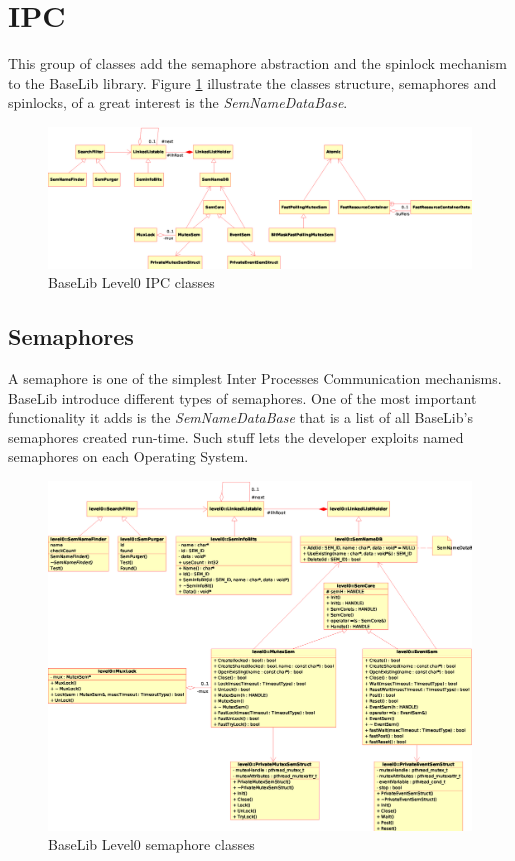 \section{IPC}
This group of classes add the semaphore abstraction and the spinlock mechanism to the BaseLib library. Figure \ref{f:level0:ipc} illustrate the classes structure, semaphores and spinlocks, of a great interest is the \textit{SemNameDataBase}.

\begin{figure}[h!]
 \begin{center}
  \includegraphics[width=\textwidth]{level0/level0-IPC.eps}
  \caption{BaseLib Level0 IPC classes}
  \label{f:level0:ipc}
 \end{center}
\end{figure}



\subsection{Semaphores}
A semaphore is one of the simplest Inter Processes Communication mechanisms. BaseLib introduce different types of semaphores. One of the most important functionality it adds is the \textit{SemNameDataBase} that is a list of all BaseLib's semaphores created run-time. Such stuff lets the developer exploits named semaphores on each Operating System.

\begin{figure}[h!]
 \begin{center}
  \includegraphics[width=\textwidth]{level0/level0-IPC-Sem.eps}
  \caption{BaseLib Level0 semaphore classes}
  \label{f:level0:ipc-sem}
 \end{center}
\end{figure}

